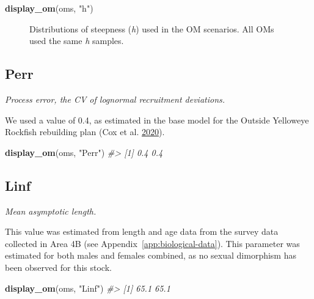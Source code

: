 \documentclass[11pt]{book}
\newenvironment{Shaded}{\begin{snugshade}}{\end{snugshade}}
\newcommand{\CommentTok}[1]{\textcolor[rgb]{0.56,0.35,0.01}{\textit{#1}}}
\newcommand{\KeywordTok}[1]{\textcolor[rgb]{0.13,0.29,0.53}{\textbf{#1}}}
\newcommand{\NormalTok}[1]{#1}
\newcommand{\OperatorTok}[1]{\textcolor[rgb]{0.81,0.36,0.00}{\textbf{#1}}}
\newcommand{\StringTok}[1]{\textcolor[rgb]{0.31,0.60,0.02}{#1}}
\begin{document}
\begin{Shaded}
\end{Shaded}
\begin{Shaded}
\begin{Highlighting}[]
\KeywordTok{display_om}\NormalTok{(oms, }\StringTok{"h"}\NormalTok{)}
\end{Highlighting}
\end{Shaded}
\begin{figure}[htb]

{\centering {} 

}

\caption{Distributions of steepness (\emph{h}) used in the OM scenarios. All OMs used the same \emph{h} samples.}\label{fig:desc-stock-h-yelloweye}
\end{figure}
\label{app:desc-stock-perr-yelloweye}
\subsection{Perr}

\emph{Process error, the CV of lognormal recruitment deviations.}

We used a value of 0.4, as estimated in the base model for the Outside Yelloweye Rockfish rebuilding plan (Cox et al. \protect\hyperlink{ref-cox2020}{2020}).
\begin{Shaded}
\begin{Highlighting}[]
\KeywordTok{display_om}\NormalTok{(oms, }\StringTok{"Perr"}\NormalTok{)}
\CommentTok{#> [1] 0.4 0.4}
\end{Highlighting}
\end{Shaded}
\label{app:desc-stock-linf-yelloweye}
\subsection{Linf}

\emph{Mean asymptotic length.}

This value was estimated from length and age data from the survey data collected in Area 4B (see Appendix~\ref{app:biological-data}). This parameter was estimated for both males and females combined, as no sexual dimorphism has been observed for this stock.
\begin{Shaded}
\begin{Highlighting}[]
\KeywordTok{display_om}\NormalTok{(oms, }\StringTok{"Linf"}\NormalTok{)}
\CommentTok{#> [1] 65.1 65.1}
\end{Highlighting}
\end{Shaded}
\label{app:desc-stock-k-yelloweye}
\end{document}
